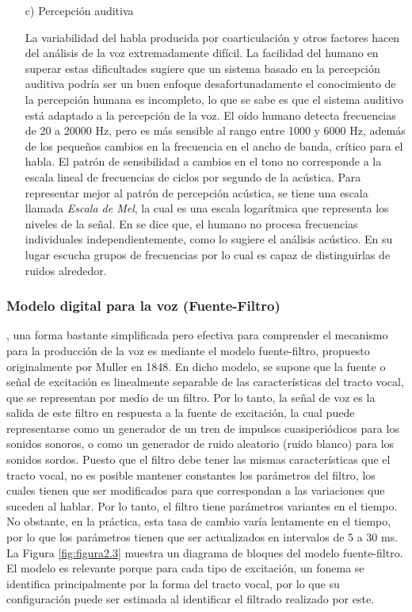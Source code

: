 \begin{enumerate}
\newpage
\item[c)]Percepción auditiva
\par
La variabilidad del habla producida por coarticulación y otros factores hacen del análisis de la voz extremadamente difícil.
\vskip 0.5cm
La facilidad del humano en superar estas dificultades sugiere que un sistema basado en la percepción auditiva podría ser un buen enfoque desafortunadamente el conocimiento de la percepción humana es incompleto, lo que se sabe es que el sistema auditivo está adaptado a la percepción de la voz.
\vskip 0.5cm
El oído humano detecta frecuencias de 20 a 20000 Hz, pero es más sensible al rango entre 1000 y 6000 Hz, además de los pequeños cambios en la frecuencia en el ancho de banda, crítico para el habla. El patrón de sensibilidad a cambios en el tono no corresponde a la escala lineal de frecuencias de ciclos por segundo de la acústica. Para representar mejor al patrón de percepción acústica, se tiene una escala llamada \textit{Escala de Mel}, la cual es una escala logarítmica que representa los niveles de la señal.
\vskip 0.5cm
En \cite{eyra} se dice que, el humano no procesa frecuencias individuales independientemente, como lo sugiere el análisis acústico. En su lugar escucha grupos de frecuencias por lo cual es capaz de distinguirlas de ruidos alrededor.
\end{enumerate}

\subsubsection{Modelo digital para la voz (Fuente-Filtro)}
\cite{rowden}, una forma bastante simplificada pero efectiva para comprender el mecanismo para la producción de la voz es mediante el modelo fuente-filtro, propuesto originalmente por Muller en 1848. En dicho modelo, se supone que la fuente o señal de excitación es linealmente separable de las características del tracto vocal, que se representan por medio de un filtro. Por lo tanto, la señal de voz es la salida de este filtro en respuesta a la fuente de excitación, la cual puede representarse como un generador de un tren de impulsos cuasiperiódicos para los sonidos sonoros, o como un generador de ruido aleatorio (ruido blanco) para los sonidos sordos.
\vskip 0.5cm
Puesto que el filtro debe tener las mismas características que el tracto vocal, no es posible mantener constantes los parámetros del filtro, los cuales tienen que ser modificados para que correspondan a las variaciones que suceden al hablar. Por lo tanto, el filtro tiene parámetros variantes en el tiempo. No obstante, en la práctica, esta tasa de cambio varía lentamente en el tiempo, por lo que los parámetros tienen que ser actualizados en intervalos de 5 a 30 ms.
\vskip 0.5cm
La Figura \ref{fig:figura2.3} muestra un diagrama de bloques del modelo fuente-filtro. El modelo es relevante porque para cada tipo de excitación, un fonema se identifica principalmente por la forma del tracto vocal, por lo que su configuración puede ser estimada al identificar el filtrado realizado por este.

